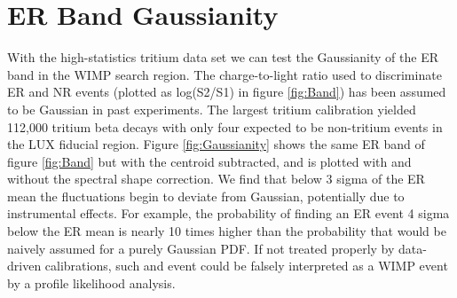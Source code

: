 \newpage

\section{ER Band Gaussianity}
With the high-statistics tritium data set we can test the Gaussianity of the ER band in the WIMP search region. The charge-to-light ratio used to discriminate ER and NR events (plotted as log(S2/S1) in figure \ref{fig:Band}) has been assumed to be Gaussian in past experiments. The largest tritium calibration yielded 112,000 tritium beta decays with only four expected to be non-tritium events \cite{LUX_BG} in the LUX fiducial region. Figure \ref{fig:Gaussianity} shows the same ER band of figure \ref{fig:Band} but with the centroid subtracted, and is plotted with and without the spectral shape correction. We find that below 3 sigma of the ER mean the fluctuations begin to deviate from Gaussian, potentially due to instrumental effects. For example, the probability of finding an ER event 4 sigma below the ER mean is nearly 10 times higher than the probability that would be naively assumed for a purely Gaussian PDF. If not treated properly by data-driven calibrations, such and event could be falsely interpreted as a WIMP event by a profile likelihood analysis.

